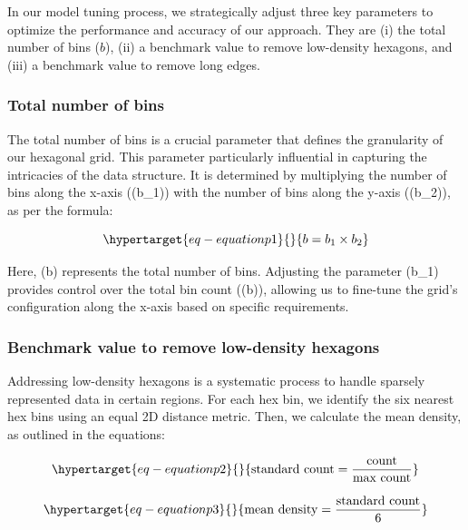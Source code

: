 \documentclass[
  12pt]{article}
\begin{document}
In our model tuning process, we strategically adjust three key
parameters to optimize the performance and accuracy of our approach.
They are (i) the total number of bins (\(b\)), (ii) a benchmark value to
remove low-density hexagons, and (iii) a benchmark value to remove long
edges.

\hypertarget{total-number-of-bins}{%
\subsubsection{Total number of bins}\label{total-number-of-bins}}

The total number of bins is a crucial parameter that defines the
granularity of our hexagonal grid. This parameter particularly
influential in capturing the intricacies of the data structure. It is
determined by multiplying the number of bins along the x-axis ((b\_1))
with the number of bins along the y-axis ((b\_2)), as per the formula:

\begin{equation}\protect\hypertarget{eq-equationp1}{}{
b = b_1 \times b_2
}\label{eq-equationp1}\end{equation}

Here, (b) represents the total number of bins. Adjusting the parameter
(b\_1) provides control over the total bin count ((b)), allowing us to
fine-tune the grid's configuration along the x-axis based on specific
requirements.

\hypertarget{benchmark-value-to-remove-low-density-hexagons}{%
\subsubsection{Benchmark value to remove low-density
hexagons}\label{benchmark-value-to-remove-low-density-hexagons}}

Addressing low-density hexagons is a systematic process to handle
sparsely represented data in certain regions. For each hex bin, we
identify the six nearest hex bins using an equal 2D distance metric.
Then, we calculate the mean density, as outlined in the equations:

\begin{equation}\protect\hypertarget{eq-equationp2}{}{
\text{standard count} = \frac{\text{count}}{\text{max count}} 
}\label{eq-equationp2}\end{equation}

\begin{equation}\protect\hypertarget{eq-equationp3}{}{
\text{mean density} = \frac{\text{standard count}}{6} 
}\label{eq-equationp3}\end{equation}
\end{document}

